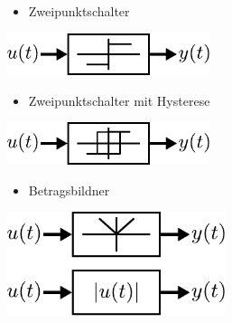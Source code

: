 \begin{figure}[h]
	\begin{subfigure}[c]{\textwidth}
		\begin{minipage}{0.5\textwidth}
			\begin{itemize}
				\item Zweipunktschalter 
			\end{itemize}
		\end{minipage}
		\begin{minipage}{0.5\textwidth}
			\centering
			\includegraphics[width=0.65\textwidth]{Abbildungen/Modellbildung/PDF/Zweipunktschalter.pdf}
		\end{minipage}
	\end{subfigure} 
	\vspace{1cm}
	\begin{subfigure}[c]{\textwidth}
		\begin{minipage}{0.5\textwidth}
			\begin{itemize}
				\item Zweipunktschalter mit Hysterese
			\end{itemize}
		\end{minipage}\hfill
		\begin{minipage}{0.5\textwidth}
			\centering
			\includegraphics[width=0.65\textwidth]{Abbildungen/Modellbildung/PDF/ZweipunktschalterHyst.pdf}
		\end{minipage}
	\end{subfigure} 
	\vspace{1cm}
	\begin{subfigure}[c]{\textwidth}
		\begin{minipage}{0.5\textwidth}
			\begin{itemize}
				\item Betragsbildner
			\end{itemize}
		\end{minipage}\hfill
		\begin{minipage}{0.5\textwidth}
			\centering
			\includegraphics[width=0.7\textwidth]{Abbildungen/Modellbildung/PDF/Betragsglied.pdf}

\end{minipage}
\end{subfigure}
\end{figure}
